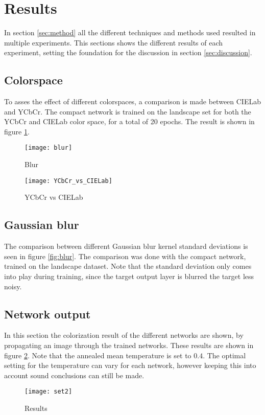 \section{Results}\label{sec:results}

In section \ref{sec:method} all the different techniques and methods used resulted in multiple experiments. This sections shows the different results of each experiment, setting the foundation for the discussion in section \ref{sec:discussion}.

\subsection{Colorspace}
To asses the effect of different colorspaces, a comparison is made between CIELab and YCbCr. The compact network is trained on the landscape set for both the YCbCr and CIELab color space, for a total of 20 epochs. The result is shown in figure \ref{fig:YCbCr_vs_CIELab}.


\begin{figure}[h]
\begin{minipage}{0.5\textwidth}
		\centering
		\texttt{[image: blur]}
		\caption{Blur}
		\label{fig:blur}
\end{minipage}
\begin{minipage}{.5\textwidth}
	
	\centering
	\texttt{[image: YCbCr\_vs\_CIELab]}
	\caption{YCbCr vs CIELab}
	\label{fig:YCbCr_vs_CIELab}
	
\end{minipage}
\end{figure}

\subsection{Gaussian blur}
The comparison between different Gaussian blur kernel standard deviations is seen in figure \ref{fig:blur}. The comparison was done with the compact network, trained on the landscape dataset. Note that the standard deviation only comes into play during training, since the target output layer is blurred the target less noisy. 

\subsection{Network output}
In this section the colorization result of the different networks are shown, by propagating an image through the trained networks. These results are shown in figure \ref{fig:results}. Note that the annealed mean temperature is set to $0.4$. The optimal setting for the temperature can vary for each network, however keeping this into account sound conclusions can still be made. 

\clearpage
\begin{figure}[h!]
	\centering
	\texttt{[image: set2]}
	\caption{Results}
	\label{fig:results}
\end{figure}



